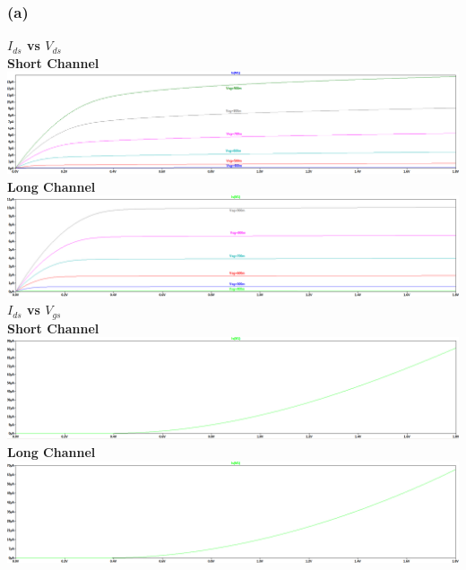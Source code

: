 \documentclass{article}
\begin{document}
\subsubsection*{(a)}
\textbf{$I_{ds}$ vs $V_{ds}$}\\
 \newline
\textbf{Short Channel}\\
\includegraphics[scale=0.28]{./figs/Q4_pmos_sc_vds.png}\\
 \newline
\textbf{Long Channel}\\
\includegraphics[scale=0.28]{./figs/Q4_pmos_lc_vds.png}
 \newline
 \newline
\textbf{$I_{ds}$ vs $V_{gs}$}\\
 \newline
\textbf{Short Channel}\\
\includegraphics[scale=0.28]{./figs/Q4_pmos_sc_vgs.png}\\
 \newline
\textbf{Long Channel}\\
\includegraphics[scale=0.28]{./figs/Q4_pmos_lc_vgs.png}
\end{document}
